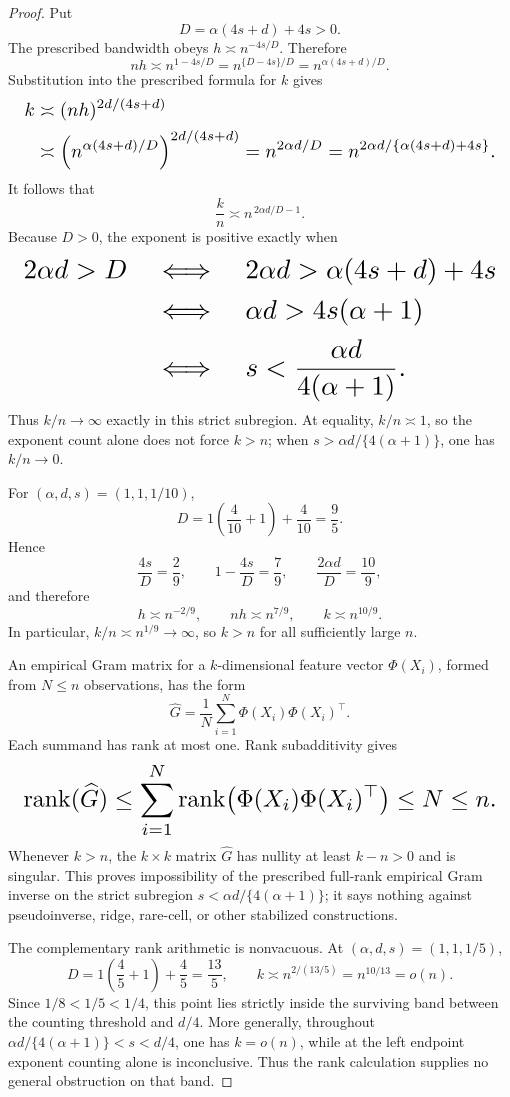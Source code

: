 \documentclass{article}
\begin{document}
\begin{proof}
Put
\[
D=\alpha(4s+d)+4s>0.
\]
The prescribed bandwidth obeys \(h\asymp n^{-4s/D}\). Therefore
\[
nh\asymp n^{1-4s/D}
=n^{\{D-4s\}/D}
=n^{\alpha(4s+d)/D}.
\]
Substitution into the prescribed formula for \(k\) gives
\[
\makebox[\linewidth][c]{\resizebox{0.98\linewidth}{!}{\(\displaystyle \begin{aligned}
k
&\asymp(nh)^{2d/(4s+d)}\\
&\asymp
\left(n^{\alpha(4s+d)/D}\right)^{2d/(4s+d)}
=n^{2\alpha d/D}
=n^{2\alpha d/\{\alpha(4s+d)+4s\}}.
\end{aligned}\)}}
\]
It follows that
\[
\frac{k}{n}\asymp n^{\,2\alpha d/D-1}.
\]
Because \(D>0\), the exponent is positive exactly when
\[
\makebox[\linewidth][c]{\resizebox{0.98\linewidth}{!}{\(\displaystyle \begin{aligned}
2\alpha d>D
&\quad\Longleftrightarrow\quad
2\alpha d>\alpha(4s+d)+4s\\
&\quad\Longleftrightarrow\quad
\alpha d>4s(\alpha+1)\\
&\quad\Longleftrightarrow\quad
s<\frac{\alpha d}{4(\alpha+1)}.
\end{aligned}\)}}
\]
Thus \(k/n\to\infty\) exactly in this strict subregion. At equality, \(k/n\asymp1\), so the exponent count alone does not force \(k>n\); when \(s>\alpha d/\{4(\alpha+1)\}\), one has \(k/n\to0\).

For \((\alpha,d,s)=(1,1,1/10)\),
\[
D=1\left(\frac4{10}+1\right)+\frac4{10}=\frac95.
\]
Hence
\[
\frac{4s}{D}=\frac29,
\qquad
1-\frac{4s}{D}=\frac79,
\qquad
\frac{2\alpha d}{D}=\frac{10}{9},
\]
and therefore
\[
h\asymp n^{-2/9},
\qquad
nh\asymp n^{7/9},
\qquad
k\asymp n^{10/9}.
\]
In particular, \(k/n\asymp n^{1/9}\to\infty\), so \(k>n\) for all sufficiently large \(n\).

An empirical Gram matrix for a \(k\)-dimensional feature vector \(\Phi(X_i)\), formed from \(N\le n\) observations, has the form
\[
\widehat G=\frac1N\sum_{i=1}^N\Phi(X_i)\Phi(X_i)^\top.
\]
Each summand has rank at most one. Rank subadditivity gives
\[
\makebox[\linewidth][c]{\resizebox{0.98\linewidth}{!}{\(\displaystyle \operatorname{rank}(\widehat G)
\le\sum_{i=1}^N
\operatorname{rank}\!\left(\Phi(X_i)\Phi(X_i)^\top\right)
\le N\le n.\)}}
\]
Whenever \(k>n\), the \(k\times k\) matrix \(\widehat G\) has nullity at least \(k-n>0\) and is singular. This proves impossibility of the prescribed full-rank empirical Gram inverse on the strict subregion \(s<\alpha d/\{4(\alpha+1)\}\); it says nothing against pseudoinverse, ridge, rare-cell, or other stabilized constructions.

The complementary rank arithmetic is nonvacuous. At \((\alpha,d,s)=(1,1,1/5)\),
\[
D=1\left(\frac45+1\right)+\frac45=\frac{13}{5},
\qquad
k\asymp n^{2/(13/5)}=n^{10/13}=o(n).
\]
Since \(1/8<1/5<1/4\), this point lies strictly inside the surviving band between the counting threshold and \(d/4\). More generally, throughout \(\alpha d/\{4(\alpha+1)\}<s<d/4\), one has \(k=o(n)\), while at the left endpoint exponent counting alone is inconclusive. Thus the rank calculation supplies no general obstruction on that band.
\end{proof}
\end{document}
